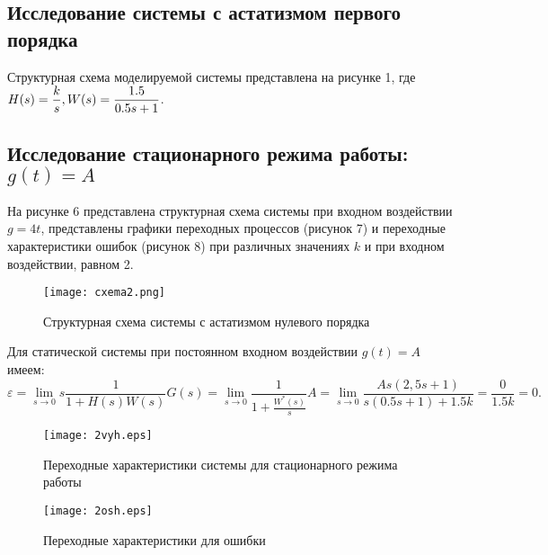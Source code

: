 \documentclass[12pt,a4paper]{article}
\begin{document}
\newpage
\begin{center}
\section{Исследование системы с астатизмом первого порядка}
\end{center}\par
Структурная схема моделируемой системы представлена на рисунке 1, где $H(s) = \displaystyle{\frac{k}{s}},\\ W(s)=\displaystyle{\frac{1.5}{0.5s + 1}}$.

\subsection{Исследование стационарного режима работы: $g(t)=A$} 
На рисунке 6 представлена структурная схема системы при входном воздействии \\$g=4t$, представлены графики переходных процессов (рисунок 7) и переходные характеристики ошибок (рисунок 8) при различных значениях $k$ и при входном воздействии, равном 2. 
\begin{figure}[H]
	\centering
	\texttt{[image: cxema2.png]}
	\caption{Структурная схема системы с астатизмом нулевого порядка}
\end{figure}
Для статической системы при постоянном входном воздействии $g(t)=A$ имеем:
\begin{equation}
    \varepsilon = \lim_{s\to0} s\frac{1}{1+H(s)W(s)}G(s) = \lim_{s\to0} \frac{1}{1+\displaystyle{\frac{W^*(s)}{s}}}A = \lim_{s\to0} \frac{As(2,5s+1)}{s(0.5s+1)+1.5k} = \frac{0}{1.5k} = 0.
\end{equation}
\begin{figure}[H]
	\centering
	\texttt{[image: 2vyh.eps]}
	\caption{Переходные характеристики системы для стационарного режима работы}
\end{figure}
\begin{figure}[H]
	\centering
	\texttt{[image: 2osh.eps]}
	\caption{Переходные характеристики для ошибки}
\end{figure}
\end{document}
